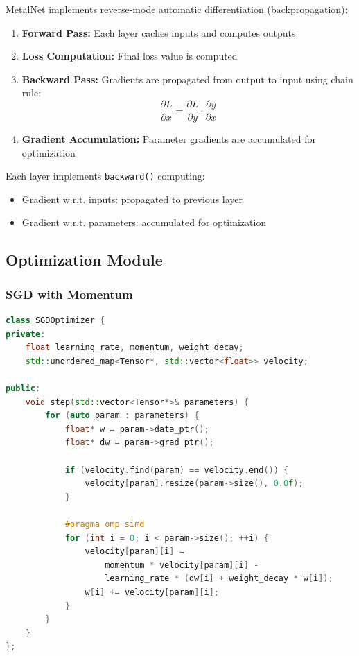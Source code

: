 \documentclass[12pt,oneside,a4paper]{report}
\begin{document}
MetalNet implements reverse-mode automatic differentiation (backpropagation):

\begin{enumerate}
    \item \textbf{Forward Pass:} Each layer caches inputs and computes outputs
    \item \textbf{Loss Computation:} Final loss value is computed
    \item \textbf{Backward Pass:} Gradients are propagated from output to input using chain rule:
    $$\frac{\partial L}{\partial x} = \frac{\partial L}{\partial y} \cdot \frac{\partial y}{\partial x}$$
    \item \textbf{Gradient Accumulation:} Parameter gradients are accumulated for optimization
\end{enumerate}

Each layer implements \texttt{backward()} computing:
\begin{itemize}
    \item Gradient w.r.t. inputs: propagated to previous layer
    \item Gradient w.r.t. parameters: accumulated for optimization
\end{itemize}

\subsection{Optimization Module}

\subsubsection{SGD with Momentum}

\begin{lstlisting}[language=C++]
class SGDOptimizer {
private:
    float learning_rate, momentum, weight_decay;
    std::unordered_map<Tensor*, std::vector<float>> velocity;

public:
    void step(std::vector<Tensor*>& parameters) {
        for (auto param : parameters) {
            float* w = param->data_ptr();
            float* dw = param->grad_ptr();

            if (velocity.find(param) == velocity.end()) {
                velocity[param].resize(param->size(), 0.0f);
            }

            #pragma omp simd
            for (int i = 0; i < param->size(); ++i) {
                velocity[param][i] =
                    momentum * velocity[param][i] -
                    learning_rate * (dw[i] + weight_decay * w[i]);
                w[i] += velocity[param][i];
            }
        }
    }
};
\end{lstlisting}
\end{document}
